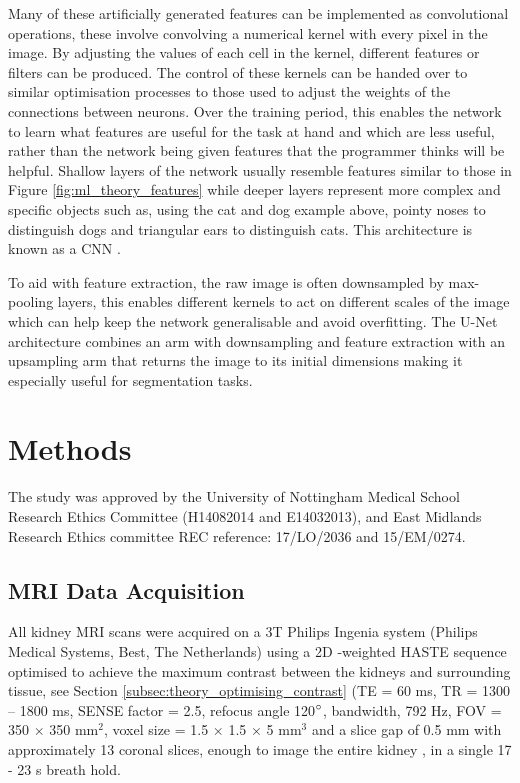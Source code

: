 Many of these artificially generated features can be implemented as convolutional operations, these involve convolving a numerical kernel with every pixel in the image. By adjusting the values of each cell in the kernel, different features or filters can be produced. The control of these kernels can be handed over to similar optimisation processes to those used to adjust the weights of the connections between neurons. Over the training period, this enables the network to learn what features are useful for the task at hand and which are less useful, rather than the network being given features that the programmer thinks will be helpful. Shallow layers of the network usually resemble features similar to those in Figure \ref{fig:ml_theory_features} while deeper layers represent more complex and specific objects such as, using the cat and dog example above, pointy noses to distinguish dogs and triangular ears to distinguish cats. This architecture is known as a \acf{CNN} \cite{fukushima_neocognitron_1988,lecun_gradient-based_1998}. 

To aid with feature extraction, the raw image is often downsampled by max-pooling layers, this enables different kernels to act on different scales of the image which can help keep the network generalisable and avoid overfitting. The U-Net architecture \cite{ronneberger_u-net_2015} combines an arm with downsampling and feature extraction with an upsampling arm that returns the image to its initial dimensions making it especially useful for segmentation tasks.

\section{Methods}
The study was approved by the University of Nottingham Medical School Research Ethics Committee (H14082014 and E14032013), and East Midlands Research Ethics committee REC reference: 17/LO/2036 and 15/EM/0274.

\subsection{MRI Data Acquisition}
\label{sec:ml_methods_acquisition}

All kidney \ac{MRI} scans were acquired on a 3T Philips Ingenia system (Philips Medical Systems, Best, The Netherlands) using a 2D \ttwo-weighted \ac{HASTE} sequence optimised to achieve the maximum contrast between the kidneys and surrounding tissue, see Section \ref{subsec:theory_optimising_contrast} (\ac{TE} = 60 ms, \ac{TR} = 1300 – 1800 ms, \ac{SENSE} factor = 2.5, refocus angle 120$\degree$, bandwidth, 792 Hz, \ac{FOV} = 350 $\times$ 350 mm$^2$, voxel size = 1.5 $\times$ 1.5 $\times$ 5 mm$^3$ and a slice gap of 0.5 mm with approximately 13 coronal slices, enough to image the entire kidney \cite{petzold_building_2014, will_automated_2014}, in a single 17 - 23 s breath hold.

